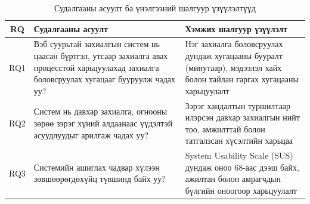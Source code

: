 \begin{table}[H]
\centering
\caption{Судалгааны асуулт ба үнэлгээний шалгуур үзүүлэлтүүд}
\label{tab:research-questions}
\begin{tabular}{|c|p{5.5cm}|p{6cm}|}
\hline
\textbf{RQ} & \textbf{Судалгааны асуулт} & \textbf{Хэмжих шалгуур үзүүлэлт} \\
\hline
RQ1 & Вэб суурьтай захиалгын систем нь цаасан бүртгэл, утсаар захиалга авах процесстой харьцуулахад захиалга боловсруулах хугацааг бууруулж чадах уу? & Нэг захиалга боловсруулах дундаж хугацааны бууралт (минутаар), мэдээлэл хайх болон тайлан гаргах хугацааны харьцуулалт \\
\hline
RQ2 & Систем нь давхар захиалга, огнооны зөрөө зэрэг хүний алдаанаас үүдэлтэй асуудлуудыг арилгаж чадах уу? & Зэрэг хандалтын туршилтаар илэрсэн давхар захиалгын нийт тоо, амжилттай болон татгалзсан хүсэлтийн харьцаа \\
\hline
RQ3 & Системийн ашиглах чадвар хүлээн зөвшөөрөгдөхүйц түвшинд байх уу? & System Usability Scale (SUS) дундаж оноо 68-аас дээш байх, ажилтан болон амрагчдын бүлгийн оноогоор харьцуулалт \\
\hline
\end{tabular}
\end{table}